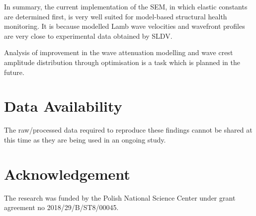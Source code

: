 \documentclass[preprint,12pt]{elsarticle}
\begin{document}
In summary, the current implementation of the SEM, in which elastic constants are determined first, is very well suited for model-based structural health monitoring. 
It is because modelled Lamb wave velocities and wavefront profiles are very close to experimental data obtained by SLDV. 

Analysis of improvement in the wave attenuation modelling and wave crest amplitude distribution through optimisation is a task which is planned in the future.

\section*{Data Availability}
The raw/processed data required to reproduce these findings cannot
be shared at this time as they are being used in an ongoing study.

\section*{Acknowledgement}
The research was funded by the Polish National Science Center under grant agreement no 2018/29/B/ST8/00045. 
		
	
    
	{}
\end{document}
